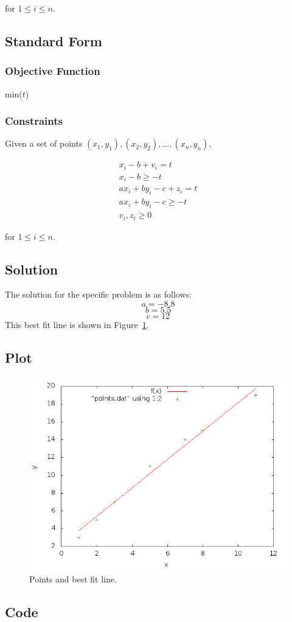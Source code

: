 \documentclass[letterpaper,10pt]{article}
\begin{document}
		for $1 \le i \le n$.


	\subsection{Standard Form}
		\subsubsection{Objective Function}
		min($t$)

		\subsubsection{Constraints}
		Given a set of points $(x_1,y_1), (x_2,y_2), \dots, (x_n,y_n)$,

		\begin{align*}
			x_i - b + v_i = t \\
			x_i - b \ge -t \\
			ax_i + by_i - c + z_i = t \\
			ax_i + by_i - c \ge -t \\
			v_i, z_i \ge 0
		\end{align*}

		for $1 \le i \le n$.


	\subsection{Solution}
		The solution for the specific problem is as follows:
		\[a = -8.8\]
		\[b = 5.5\]
		\[c = 12\]
		This best fit line is shown in Figure~\ref{fig:plot}.



	\subsection{Plot}
		\begin{figure}[!htb]
			\centering
			\includegraphics[width=6in]{plot.png}
			\caption{Points and best fit line.}
			\label{fig:plot}
		\end{figure}


	\newpage
	\subsection{Code}
		
\end{document}
